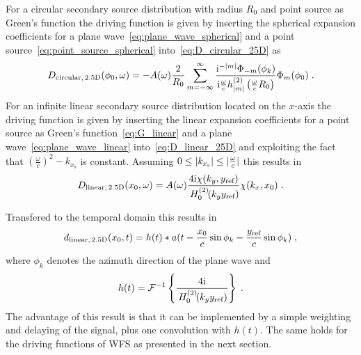 For a circular secondary source distribution with radius $R_0$ and point source
as Green's function the \twohalfD driving function is given by inserting the
spherical expansion coefficients for a plane wave~\eqref{eq:plane_wave_spherical}
and a point source~\eqref{eq:point_source_spherical} into~\eqref{eq:D_circular_25D} as
%
\begin{equation}
    D_{\text{circular},\,\twohalfD}(\phi_0,\omega) = -A(\omega) \frac{2}{R_0}
    \sum_{m=-\infty}^\infty \frac{\I^{-|m|} \Phi_{-m}(\phi_k)} {\I\omegac
    h_{|m|}^{(2)}\left(\omegac R_0\right)} \Phi_m(\phi_0) \qp
    \label{eq:D_nfchoa_pw_25D}
\end{equation}
%
For an infinite linear secondary source distribution located on the $x$-axis the
\twohalfD driving function is given by inserting the linear expansion coefficients
for a point source as Green's function~\eqref{eq:G_linear} and
a plane wave~\eqref{eq:plane_wave_linear} into~\eqref{eq:D_linear_25D} and
exploiting the fact that $(\frac{\omega}{c})^2 - k_{x_\text{s}}$ is constant. Assuming
$0 \le |k_{x_\text{s}}| \le |\frac{\omega}{c}|$ this results
in
%
\begin{equation}
    D_{\text{linear},\,\twohalfD}(x_0,\omega) = A(\omega) \frac{4\I
    \chi(k_y,y_\text{ref})}
    {\H{0}{2}(k_y y_\text{ref})} \chi(k_x,x_0) \qp
    \label{eq:D_sdm_pw_25D}
\end{equation}
%

Transfered to the temporal domain this results
in
%
\begin{equation}
    d_{\text{linear},\,\twohalfD}(x_0,t) = h(t) *
    a(t-\frac{x_0}{c}\sin\phi_k-\frac{y_\text{ref}}{c}\sin\phi_k)
    \qc
    \label{eq:d_sdm_pw_25D}
\end{equation}
%
where $\phi_k$ denotes the azimuth direction of the plane wave and
\begin{equation}
    h(t) =
     \mathcal{F}^{-1}\left\{\frac{4\mathrm{i}}{\,H_{0}^{(2)}\!(k_y y_\text{ref})}\right\} \;.
\end{equation}
The advantage of this
result is that it can be implemented by a simple weighting and delaying of
the signal, plus one convolution with $h(t)$. The same holds for the driving
functions of \ac{WFS} as presented in the next section.


